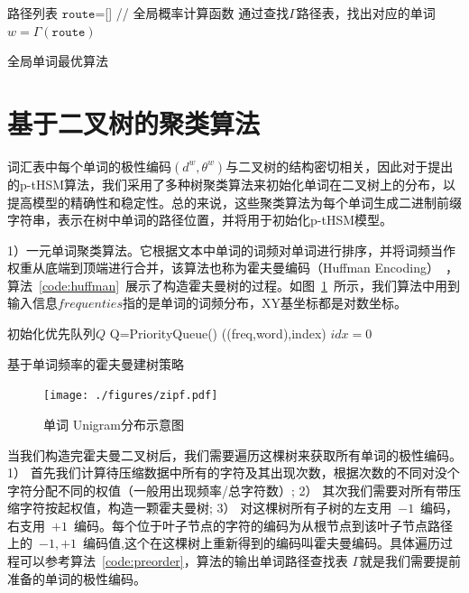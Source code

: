 \begin{algorithm}[!ht]
\SetAlgoLined
{}
 路径列表 $\mathtt{route}$=[] \;
{// 全局概率计算函数}\;
{通过查找$\Gamma$路径表，找出对应的单词}\;
$w=\Gamma(\mathtt{route})$\;
\caption{全局单词最优算法}\label{alog:global}
\end{algorithm}

\section{基于二叉树的聚类算法}
词汇表中每个单词的极性编码$(d^w,\theta^w)$与二叉树的结构密切相关，因此对于提出的p-tHSM算法，我们采用了多种树聚类算法来初始化单词在二叉树上的分布，以提高模型的精确性和稳定性。总的来说，这些聚类算法为每个单词生成二进制前缀字符串，表示在树中单词的路径位置，并将用于初始化p-tHSM模型。


1）一元单词聚类算法。它根据文本中单词的词频对单词进行排序，并将词频当作权重从底端到顶端进行合并，该算法也称为霍夫曼编码（Huffman Encoding）~，算法~\ref{code:huffman}~展示了构造霍夫曼树的过程。如图~\ref{fig:zipf}~所示，我们算法中用到输入信息$frequenties$指的是单词的词频分布，XY基坐标都是对数坐标。

\begin{algorithm}[!t]
\SetAlgoLined
{}
{初始化优先队列$Q$}\;
{Q=PriorityQueue()} \;
{((freq,word),index)}\;
{$idx=0$}\;
\caption{基于单词频率的霍夫曼建树策略}\label{code:huffman}
\end{algorithm}

\begin{figure}[!ht]
  \centering
\texttt{[image: ./figures/zipf.pdf]}
\caption{单词 Unigram分布示意图}\label{fig:zipf}
\end{figure}

当我们构造完霍夫曼二叉树后，我们需要遍历这棵树来获取所有单词的极性编码。1） 首先我们计算待压缩数据中所有的字符及其出现次数，根据次数的不同对没个字符分配不同的权值（一般用出现频率/总字符数）; 2） 其次我们需要对所有带压缩字符按起权值，构造一颗霍夫曼树; 3） 对这棵树所有子树的左支用~$-1$~编码，右支用~$+1$~编码。每个位于叶子节点的字符的编码为从根节点到该叶子节点路径上的~$-1,+1$~编码值,这个在这棵树上重新得到的编码叫霍夫曼编码。具体遍历过程可以参考算法~\ref{code:preorder}，算法的输出单词路径查找表 $\Gamma$就是我们需要提前准备的单词的极性编码。

